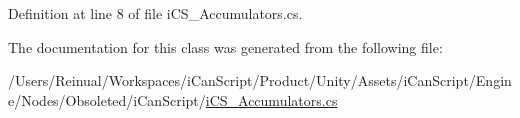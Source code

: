 Definition at line 8 of file i\+C\+S\+\_\+\+Accumulators.\+cs.



The documentation for this class was generated from the following file\+:\begin{DoxyCompactItemize}
\item 
/\+Users/\+Reinual/\+Workspaces/i\+Can\+Script/\+Product/\+Unity/\+Assets/i\+Can\+Script/\+Engine/\+Nodes/\+Obsoleted/i\+Can\+Script/\hyperlink{i_c_s___accumulators_8cs}{i\+C\+S\+\_\+\+Accumulators.\+cs}\end{DoxyCompactItemize}
